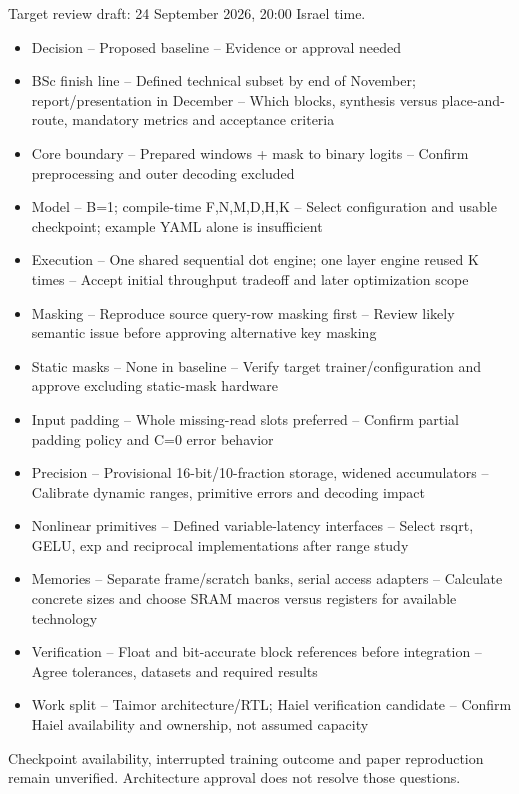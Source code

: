 \documentclass[11pt,a4paper]{article}
\begin{document}
Target review draft: 24 September 2026, 20:00 Israel time.

\begin{itemize}
\item Decision -- Proposed baseline -- Evidence or approval needed
\item BSc finish line -- Defined technical subset by end of November; report/presentation in December -- Which blocks, synthesis versus place-and-route, mandatory metrics and acceptance criteria
\item Core boundary -- Prepared windows + mask to binary logits -- Confirm preprocessing and outer decoding excluded
\item Model -- B=1; compile-time F,N,M,D,H,K -- Select configuration and usable checkpoint; example YAML alone is insufficient
\item Execution -- One shared sequential dot engine; one layer engine reused K times -- Accept initial throughput tradeoff and later optimization scope
\item Masking -- Reproduce source query-row masking first -- Review likely semantic issue before approving alternative key masking
\item Static masks -- None in baseline -- Verify target trainer/configuration and approve excluding static-mask hardware
\item Input padding -- Whole missing-read slots preferred -- Confirm partial padding policy and C=0 error behavior
\item Precision -- Provisional 16-bit/10-fraction storage, widened accumulators -- Calibrate dynamic ranges, primitive errors and decoding impact
\item Nonlinear primitives -- Defined variable-latency interfaces -- Select rsqrt, GELU, exp and reciprocal implementations after range study
\item Memories -- Separate frame/scratch banks, serial access adapters -- Calculate concrete sizes and choose SRAM macros versus registers for available technology
\item Verification -- Float and bit-accurate block references before integration -- Agree tolerances, datasets and required results
\item Work split -- Taimor architecture/RTL; Haiel verification candidate -- Confirm Haiel availability and ownership, not assumed capacity
\end{itemize}


Checkpoint availability, interrupted training outcome and paper reproduction remain unverified. Architecture approval does not resolve those questions.
\end{document}
